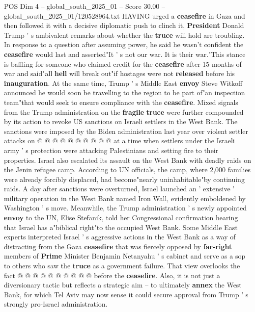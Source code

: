 \begin{textsample}{POS Dim 4 – global\_south\_2025\_01 – Score 30.00 – global\_south\_2025\_01/120528964.txt}  \label{ex:f4_pos_003}
HAVING urged a \textbf{ceasefire} in Gaza and then followed it with a decisive diplomatic push to clinch it, \textbf{President} Donald Trump ' s ambivalent remarks about whether the \textbf{truce} will hold are troubling.
In response to a question after assuming power, he said he wasn't confident the \textbf{ceasefire} would last and asserted"It ' s not our war.
It is their war."This stance is baffling for someone who claimed credit for the \textbf{ceasefire} after 15 months of war and said"all \textbf{hell} will break out"if hostages were not \textbf{released} before his \textbf{inauguration}.
At the same time, Trump ' s Middle East \textbf{envoy} Steve Witkoff announced he would soon be travelling to the region to be part of"an inspection team"that would seek to ensure compliance with the \textbf{ceasefire}.
Mixed signals from the Trump administration on the \textbf{fragile} \textbf{truce} were further compounded by its action to revoke US sanctions on Israeli settlers in the West Bank.
The sanctions were imposed by the Biden administration last year over violent settler attacks on @ @ @ @ @ @ @ @ @ @ at a time when settlers under the Israeli army ' s protection were attacking Palestinians and setting fire to their properties.
Israel also escalated its assault on the West Bank with deadly raids on the Jenin refugee camp.
According to UN officials, the camp, where 2,000 families were already forcibly displaced, had become"nearly uninhabitable"by continuing raids.
A day after sanctions were overturned, Israel launched an ' extensive ' military operation in the West Bank named Iron Wall, evidently emboldened by Washington ' s move.
Meanwhile, the Trump administration ' s newly appointed \textbf{envoy} to the UN, Elise Stefanik, told her Congressional confirmation hearing that Israel has a"biblical right"to the occupied West Bank.
Some Middle East experts interpreted Israel ' s aggressive actions in the West Bank as a way of distracting from the Gaza \textbf{ceasefire} that was fiercely opposed by \textbf{far-right} members of \textbf{Prime} Minister Benjamin Netanyahu ' s cabinet and serve as a sop to others who saw the \textbf{truce} as a government failure.
That view overlooks the fact @ @ @ @ @ @ @ @ @ @ before the \textbf{ceasefire}.
Also, it is not just a diversionary tactic but reflects a strategic aim -- to ultimately \textbf{annex} the West Bank, for which Tel Aviv may now sense it could secure approval from Trump ' s strongly pro-Israel administration.

\end{textsample}
